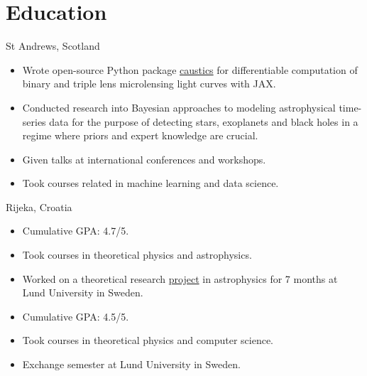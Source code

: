 \documentclass[11pt,a4paper,roman, colorlinks,linkcolor=true]{moderncv}
\begin{document}
\section{Education}
{St Andrews, Scotland}{}{    \begin{itemize}
            \item Wrote open-source Python package \href{https://github.com/fbartolic/caustics}{caustics} for differentiable computation of binary and triple lens microlensing light curves with JAX.
            \item Conducted research into Bayesian approaches to modeling astrophysical time-series data for the purpose of detecting stars, exoplanets and black holes in a regime where priors and expert knowledge are crucial.
       \item Given talks at international conferences and workshops.
           \item Took courses related in machine learning and data science.
\end{itemize}}
{Rijeka, Croatia}{}{\begin{itemize}\item Cumulative GPA: 4.7/5. 
            \item Took courses in theoretical physics and astrophysics.
\item Worked on a theoretical research \href{https://github.com/fbartolic/master_thesis}{project} in astrophysics for 7 months at Lund University in Sweden.\end{itemize}}
{\begin{itemize}\item Cumulative GPA: 4.5/5.
            \item Took courses in theoretical physics and computer science.
            \item Exchange semester at Lund University in Sweden.
\end{itemize}}
\end{document}
